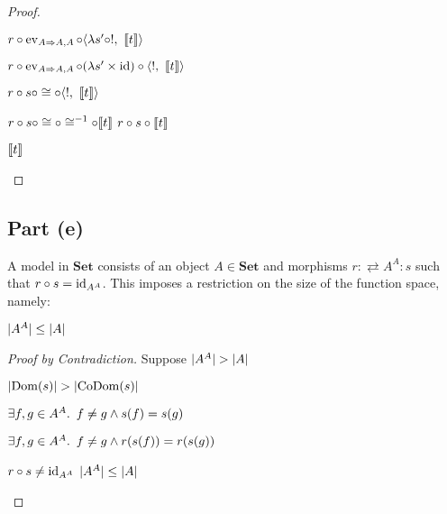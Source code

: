 \begin{prop}
\begin{proof}
\begin{itemize}
        \step[=]
          $r\circ\operatorname{ev}_{A\Rightarrow A,A}\circ\langle\lambda s^\prime\circ !,~\llbracket t \rrbracket\rangle$

        \step[=]
          $r\circ\operatorname{ev}_{A\Rightarrow A,A}\circ(\lambda s^\prime\times\operatorname{id})\circ\langle !,~\llbracket t \rrbracket\rangle$
          \marginnote{\Lemma-\ref{lemma:prod-comp-factor}}

        \step[=]
          $r\circ s\circ\cong\circ\langle !,~\llbracket t \rrbracket\rangle$

        \step[=]
          $r\circ s\circ\cong\circ\cong^{-1}\circ\llbracket t \rrbracket$
          \marginnote{\Lemma-\ref{lemma:prod-term-iso}}
        \step[=]
          $r\circ s\circ\llbracket t \rrbracket$

        \step[=]
          $\llbracket t \rrbracket$
          \qedhere
    \end{itemize}
  \end{proof}
\end{prop}


\subsection{Part (e)}\label{sec:q-2-e}

A model in $\mathbf{Set}$ consists of an object $A\in\mathbf{Set}$ and morphisms ${r : \rightleftarrows A^A : s}$ such that ${r\circ s = \operatorname{id}_{A^A}}$. This imposes a restriction on the size of the function space, namely:

\begin{prop}
  $\lvert A^A\rvert\leq\lvert A\rvert$

  \begin{proof}[Proof by Contradiction] Suppose $\lvert A^A\rvert > \lvert A\rvert$
    \begin{itemize}
      \step[\iffs] $\lvert\operatorname{Dom}(s)\rvert > \lvert\operatorname{CoDom}(s)\rvert$

      \step[\imps] $\exists f, g\in A^A\ldotp~ f\neq g\land s(f) = s(g)$

      \step[\imps] $\exists f, g\in A^A\ldotp~ f\neq g\land r(s(f)) = r(s(g))$

      \step[\imps] $r\circ s\neq\operatorname{id}_{A^A}$
      \step[\contras] $\lvert A^A\rvert\leq\lvert A\rvert$
        \qedhere
    \end{itemize}
  \end{proof}
\end{prop}


